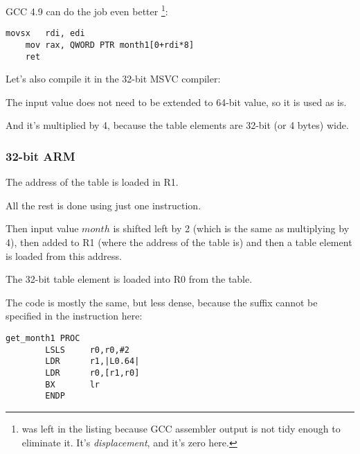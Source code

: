 \Optimizing GCC 4.9 can do the job even better
\footnote{ was left in the listing because GCC assembler output is not tidy enough to eliminate it.
It's \emph{displacement}, and it's zero here.}:

\begin{lstlisting}[caption=\Optimizing GCC 4.9 x64,style=customasmx86]
	movsx	rdi, edi
	mov	rax, QWORD PTR month1[0+rdi*8]
	ret
\end{lstlisting}


Let's also compile it in the 32-bit MSVC compiler:



The input value does not need to be extended to 64-bit value, so it is used as is.

And it's multiplied by 4, because the table elements are 32-bit (or 4 bytes) wide.

\subsubsection{32-bit ARM}





The address of the table is loaded in R1.

All the rest is done using just one \LDR instruction.

Then input value $month$ is shifted left by 2 (which is the same as multiplying by 4), then added
to R1 (where the address of the table is) and then a table element is loaded from this address.

The 32-bit table element is loaded into R0 from the table.


The code is mostly the same, but less dense, because the \LSL suffix cannot be specified in the \LDR instruction here:

\begin{lstlisting}[style=customasmARM]
get_month1 PROC
        LSLS     r0,r0,#2
        LDR      r1,|L0.64|
        LDR      r0,[r1,r0]
        BX       lr
        ENDP
\end{lstlisting}

